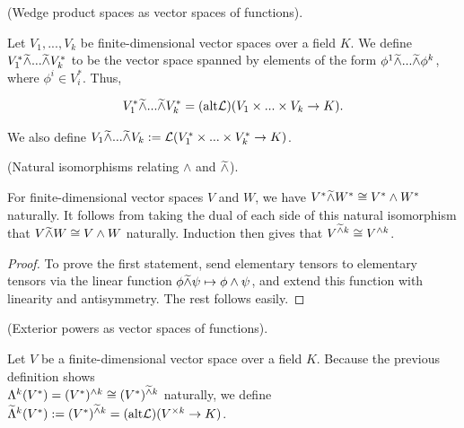 \begin{defn}
    (Wedge product spaces as vector spaces of functions).
    
    Let $V_1, ..., V_k$ be finite-dimensional vector spaces over a field $K$. We define $V_1^* \widetilde{\wedge} ... \widetilde{\wedge} V_k^*$ to be the vector space spanned by elements of the form $\phi^1 \widetilde{\wedge} ... \widetilde{\wedge} \phi^k$, where $\phi^i \in V_i^*$. Thus,
    
    \begin{align*}
        V_1^* \widetilde{\wedge} ... \widetilde{\wedge} V_k^* = (\text{alt} \mathcal{L})(V_1 \times ... \times V_k \rightarrow K).
    \end{align*}
    
    We also define $V_1 \widetilde{\wedge} ... \widetilde{\wedge} V_k := \mathcal{L}(V_1^* \times ... \times V_k^* \rightarrow K)$.
\end{defn}

\begin{theorem}
    (Natural isomorphisms relating $\wedge$ and $\widetilde{\wedge}$).
     
    For finite-dimensional vector spaces $V$ and $W$, we have $V^* \widetilde{\wedge} W^* \cong V^* \wedge W^*$ naturally. It follows from taking the dual of each side of this natural isomorphism that $V \widetilde{\wedge} W \cong V \wedge W$ naturally. Induction then gives that $V^{\widetilde{\wedge} k} \cong V^{\wedge k}$.
\end{theorem}

\begin{proof}
    To prove the first statement, send elementary tensors to elementary tensors via the linear function $\phi \widetilde{\wedge} \psi \mapsto \phi \wedge \psi$, and extend this function with linearity and antisymmetry. The rest follows easily.
\end{proof}

\begin{defn}
    (Exterior powers as vector spaces of functions).
    
    Let $V$ be a finite-dimensional vector space over a field $K$. Because the previous definition shows \\ ${\Lambda^k(V^*) = (V^*)^{\wedge k} \cong (V^*)^{\widetilde{\wedge} k}}$ naturally, we define $\widetilde{\Lambda}^k(V^*) := (V^*)^{\widetilde{\wedge} k} = (\text{alt} \mathcal{L})(V^{\times k} \rightarrow K)$.
\end{defn}

    
    
